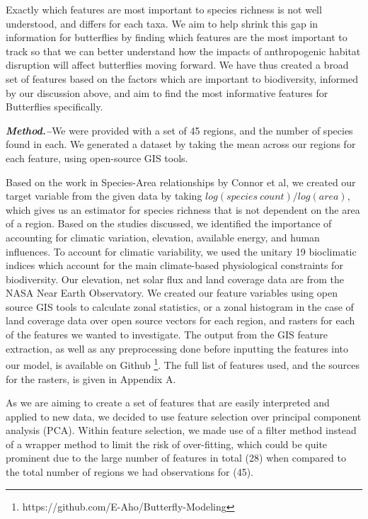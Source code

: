 \documentclass[prl,showpacs,superscriptaddress,twocolumn,longbibliography]{revtex4-1}
\begin{document}
Exactly which features are most important to species richness is not well understood, and differs for each taxa. We aim to help shrink this gap in information for butterflies by finding which features are the most important to track so that we can better understand how the impacts of anthropogenic habitat disruption will affect butterflies moving forward. We have thus created a broad set of features based on the factors which are important to biodiversity, informed by our discussion above, and aim to find the most informative features for Butterflies specifically.


\noindent 

{\bf\em Method.--}We were provided with a set of 45 regions, and the number of species found in each. We generated a dataset by taking the mean across our regions for each feature, using open-source GIS tools.

Based on the work in Species-Area relationships by Connor et al\cite{connor_2001_sar}, we created our target variable from the given data by taking $log(species \: count)/log(area)$, which gives us an estimator for species richness that is not dependent on the area of a region. Based on the studies discussed, we identified the importance of accounting for climatic variation, elevation, available energy, and human influences.  To account for climatic variability, we used the unitary 19 bioclimatic indices which account for the main climate-based physiological constraints for biodiversity\cite{hijmans_very_2005}. Our elevation, net solar flux and land coverage data are from the NASA Near Earth Observatory. We created our feature variables using open source GIS tools\cite{QGIS_software} to calculate zonal statistics, or a zonal histogram in the case of land coverage data over open source vectors for each region\cite{natural_earth_vectors, gadm_vectors, taman_kinbalu_pp, calakmul_pp}, and rasters for each of the features we wanted to investigate. The output from the GIS feature extraction, as well as any preprocessing done before inputting the features into our model, is available on Github \footnote{https://github.com/E-Aho/Butterfly-Modeling}. The full list of features used, and the sources for the rasters, is given in Appendix A.

As we are aiming to create a set of features that are easily interpreted and applied to new data, we decided to use feature selection over principal component analysis (PCA). Within feature selection, we made use of a filter method instead of a wrapper method to limit the risk of over-fitting, which could be quite prominent due to the large number of features in total (28) when compared to the total number of regions we had observations for (45).
\end{document}
